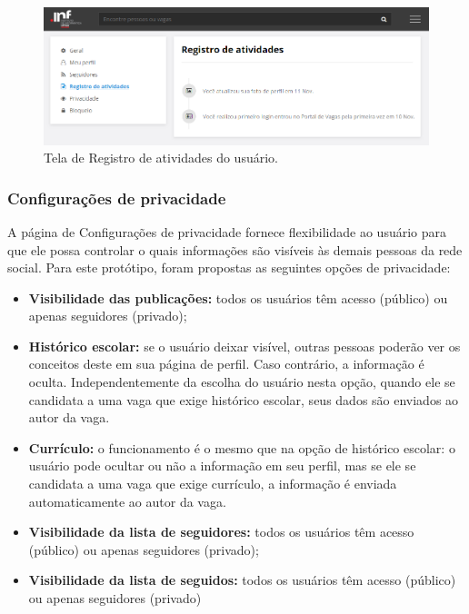 \begin{figure}[h]
    \caption{Tela de Registro de atividades do usuário.}
       	\begin{center}
            \includegraphics[width=1\textwidth]{figuras/config_03.png}
        \end{center}
    \label{telaConfigLog}
\end{figure}

\subsubsection{Configurações de privacidade}
\label{PDVFunConfiguracoesPrivacidade}

A página de Configurações de privacidade fornece flexibilidade ao usuário para que ele possa controlar o quais informações são visíveis às demais pessoas da rede social. Para este protótipo, foram propostas as seguintes opções de privacidade:

\begin{itemize}
    \item \textbf{Visibilidade das publicações:} todos os usuários têm acesso (público) ou apenas seguidores (privado);
    
    \item \textbf{Histórico escolar:} se o usuário deixar visível, outras pessoas poderão ver os conceitos deste em sua página de perfil. Caso contrário, a informação é oculta. Independentemente da escolha do usuário nesta opção, quando ele se candidata a uma vaga que exige histórico escolar, seus dados são enviados ao autor da vaga.
    
    \item \textbf{Currículo:} o funcionamento é o mesmo que na opção de histórico escolar: o usuário pode ocultar ou não a informação em seu perfil, mas se ele se candidata a uma vaga que exige currículo, a informação é enviada automaticamente ao autor da vaga.
    
    \item \textbf{Visibilidade da lista de seguidores:} todos os usuários têm acesso (público) ou apenas seguidores (privado);
    
    \item \textbf{Visibilidade da lista de seguidos:} todos os usuários têm acesso (público) ou apenas seguidores (privado)
\end{itemize}


